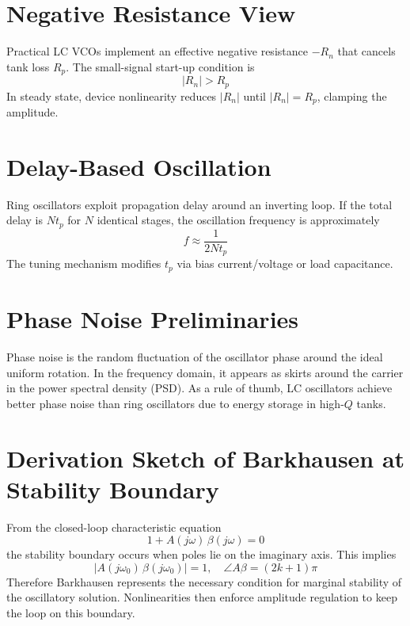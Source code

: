 \section{Negative Resistance View}
Practical LC VCOs implement an effective negative resistance \(-R_n\) that cancels tank loss \(R_p\). The small-signal start-up condition is
\[
|R_n| > R_p
\]
In steady state, device nonlinearity reduces \(|R_n|\) until \(|R_n| = R_p\), clamping the amplitude.

\section{Delay-Based Oscillation}
Ring oscillators exploit propagation delay around an inverting loop. If the total delay is \(N t_p\) for \(N\) identical stages, the oscillation frequency is approximately
\[
f \approx \frac{1}{2 N t_p}
\]
The tuning mechanism modifies \(t_p\) via bias current/voltage or load capacitance.

\section{Phase Noise Preliminaries}
Phase noise is the random fluctuation of the oscillator phase around the ideal uniform rotation. In the frequency domain, it appears as skirts around the carrier in the power spectral density (PSD). As a rule of thumb, LC oscillators achieve better phase noise than ring oscillators due to energy storage in high-\(Q\) tanks.

\section{Derivation Sketch of Barkhausen at Stability Boundary}
From the closed-loop characteristic equation
\[
1 + A(j\omega)\,\beta(j\omega) = 0
\]
the stability boundary occurs when poles lie on the imaginary axis. This implies
\[
|A(j\omega_0)\,\beta(j\omega_0)| = 1,\quad \angle A\beta = (2k+1)\pi
\]
Therefore Barkhausen represents the necessary condition for marginal stability of the oscillatory solution. Nonlinearities then enforce amplitude regulation to keep the loop on this boundary.

